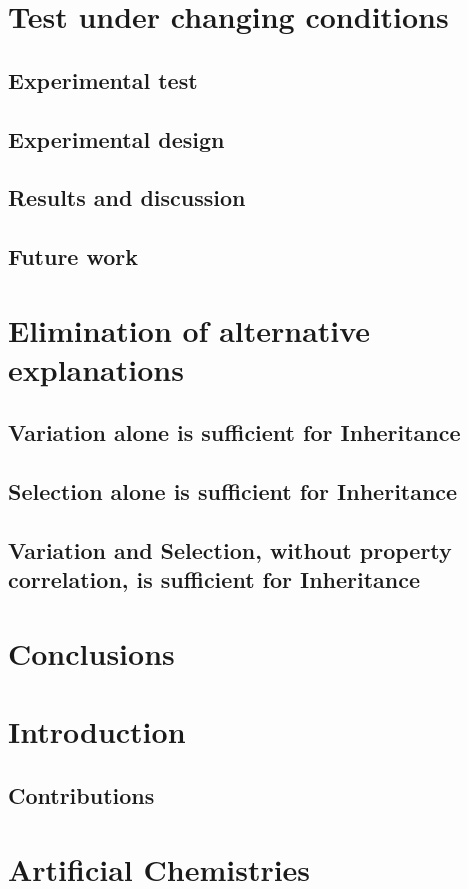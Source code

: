 \documentclass[]{report}
\begin{document}
\chapter{Test under changing conditions}
\section{Experimental test}
\section{Experimental design}
\section{Results and discussion}
\section{Future work}

\chapter{Elimination of alternative explanations}
\section{Variation alone is sufficient for Inheritance}
\section{Selection alone is sufficient for Inheritance}
\section{Variation and Selection, without property correlation, is sufficient for Inheritance}

\chapter{Conclusions}

\chapter{Introduction}
\section{Contributions}

\chapter{Artificial Chemistries}
\end{document}

